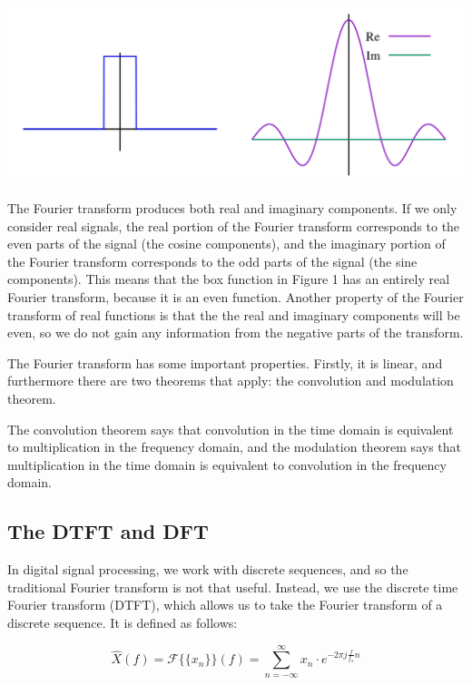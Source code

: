 \documentclass[12pt]{article}
\begin{document}
\begin{minipage}{\textwidth}
  \centering
  \includegraphics[trip=0 0 0, clip, scale=0.2]{fourier_transform}
\end{minipage}

The Fourier transform produces both real and imaginary components. If we only consider real signals, the real portion of the Fourier transform corresponds to the even parts of the signal (the cosine components), and the imaginary portion of the Fourier transform corresponds to the odd parts of the signal (the sine components). This means that the box function in Figure 1 has an entirely real Fourier transform, because it is an even function. Another property of the Fourier transform of real functions is that the the real and imaginary components will be even, so we do not gain any information from the negative parts of the transform.

The Fourier transform has some important properties. Firstly, it is linear, and furthermore there are two theorems that apply: the convolution and modulation theorem.

The convolution theorem says that convolution in the time domain is equivalent to multiplication in the frequency domain, and the modulation theorem says that multiplication in the time domain is equivalent to convolution in the frequency domain.

\subsection{The DTFT and DFT}

In digital signal processing, we work with discrete sequences, and so the traditional Fourier transform is not that useful. Instead, we use the discrete time Fourier transform (DTFT), which allows us to take the Fourier transform of a discrete sequence. It is defined as follows:

\[
  \hat{X}(f) = \mathcal{F}\{\{x_n\}\}(f) = \sum_{n=-\infty}^\infty x_n \cdot e^{-2\pi j \frac{f}{f_s}n}
\] 
\end{document}
